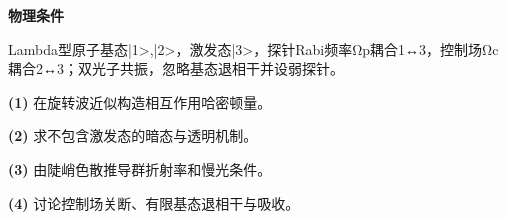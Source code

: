 \textbf{物理条件}\par Lambda型原子基态|1>,|2>，激发态|3>，探针Rabi频率Ωp耦合1↔3，控制场Ωc耦合2↔3；双光子共振，忽略基态退相干并设弱探针。
\par\noindent\textbf{(1)} 在旋转波近似构造相互作用哈密顿量。
\par\noindent\textbf{(2)} 求不包含激发态的暗态与透明机制。
\par\noindent\textbf{(3)} 由陡峭色散推导群折射率和慢光条件。
\par\noindent\textbf{(4)} 讨论控制场关断、有限基态退相干与吸收。
